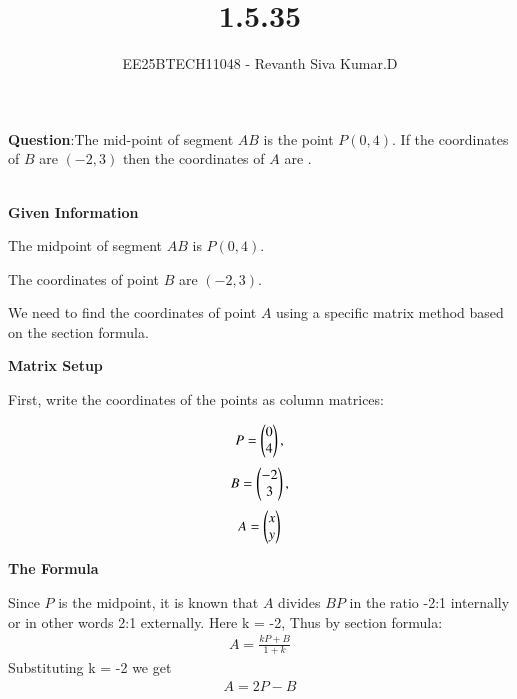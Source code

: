 \documentclass[journal]{IEEEtran}
\begin{document}
	
	
	\vspace{3cm}
	
	\title{1.5.35}
	\author{EE25BTECH11048 - Revanth Siva Kumar.D}
	\maketitle
	{\let\newpage\relax\maketitle}
	
	\renewcommand{\thefigure}{\theenumi}
	\renewcommand{\thetable}{\theenumi}
	\setlength{\intextsep}{10pt} %
	
	
	\renewcommand{\thetable}{\theenumi}
	
	\textbf{Question}:The mid-point of segment $AB$ is the point $P(0,4)$. If the coordinates of $B$ are $(-2,3)$ then the coordinates of $A$ are \underline{\hspace{1.5cm}}. 

\solution\\\textbf{Given Information}  

The midpoint of segment $AB$ is $P(0,4)$.  

The coordinates of point $B$ are $(-2,3)$.  

We need to find the coordinates of point $A$ using a specific matrix method based on the section formula.  

\textbf{Matrix Setup}  

First, write the coordinates of the points as column matrices:  

\begin{align*}
    P = \begin{pmatrix}0 \\ 4\end{pmatrix}, 
\end{align*}
\begin{align*}
    B = \begin{pmatrix}-2 \\ 3\end{pmatrix}, 
\end{align*}
\begin{align*}
    A = \begin{pmatrix}x \\ y\end{pmatrix}
\end{align*}



\textbf{The Formula}  

Since $P$ is the midpoint, it is known that $A$ divides $BP$ in the ratio -2:1 internally or in other words 2:1 externally.
Here k = -2, Thus by section formula:
\begin{align*}
A = \frac{kP+B}{1+k}
\end{align*}
Substituting k = -2 we get
\begin{align*}
    A = 2P - B
\end{align*}
\end{document}
